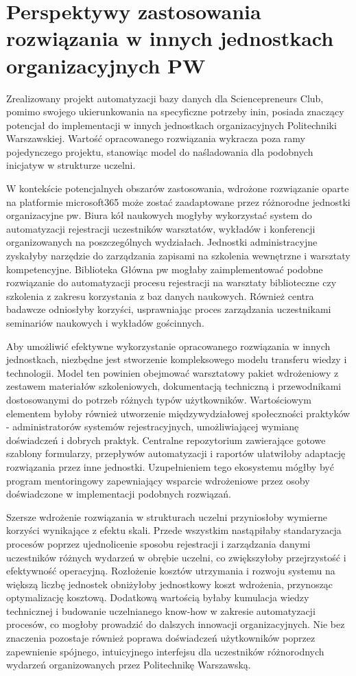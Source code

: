 \section{Perspektywy zastosowania rozwiązania w innych jednostkach organizacyjnych PW}

Zrealizowany projekt automatyzacji bazy danych dla Sciencepreneurs Club, pomimo swojego ukierunkowania na specyficzne potrzeby \gls{inin}, posiada znaczący potencjał do implementacji w innych jednostkach organizacyjnych Politechniki Warszawskiej. Wartość opracowanego rozwiązania wykracza poza ramy pojedynczego projektu, stanowiąc model do naśladowania dla podobnych inicjatyw w strukturze uczelni.

W kontekście potencjalnych obszarów zastosowania, wdrożone rozwiązanie oparte na platformie \gls{microsoft365} może zostać zaadaptowane przez różnorodne jednostki organizacyjne \gls{pw}. Biura kół naukowych mogłyby wykorzystać system do automatyzacji rejestracji uczestników warsztatów, wykładów i konferencji organizowanych na poszczególnych wydziałach. Jednostki administracyjne zyskałyby narzędzie do zarządzania zapisami na szkolenia wewnętrzne i warsztaty kompetencyjne. Biblioteka Główna \gls{pw} mogłaby zaimplementować podobne rozwiązanie do automatyzacji procesu rejestracji na warsztaty biblioteczne czy szkolenia z zakresu korzystania z baz danych naukowych. Również centra badawcze odniosłyby korzyści, usprawniając proces zarządzania uczestnikami seminariów naukowych i wykładów gościnnych.

Aby umożliwić efektywne wykorzystanie opracowanego rozwiązania w innych jednostkach, niezbędne jest stworzenie kompleksowego modelu transferu wiedzy i technologii. Model ten powinien obejmować warsztatowy pakiet wdrożeniowy z zestawem materiałów szkoleniowych, dokumentacją techniczną i przewodnikami dostosowanymi do potrzeb różnych typów użytkowników. Wartościowym elementem byłoby również utworzenie międzywydziałowej społeczności praktyków - administratorów systemów rejestracyjnych, umożliwiającej wymianę doświadczeń i dobrych praktyk. Centralne repozytorium zawierające gotowe szablony formularzy, przepływów automatyzacji i raportów ułatwiłoby adaptację rozwiązania przez inne jednostki. Uzupełnieniem tego ekosystemu mógłby być program mentoringowy zapewniający wsparcie wdrożeniowe przez osoby doświadczone w implementacji podobnych rozwiązań.

Szersze wdrożenie rozwiązania w strukturach uczelni przyniosłoby wymierne korzyści wynikające z efektu skali. Przede wszystkim nastąpiłaby standaryzacja procesów poprzez ujednolicenie sposobu rejestracji i zarządzania danymi uczestników różnych wydarzeń w obrębie uczelni, co zwiększyłoby przejrzystość i efektywność operacyjną. Rozłożenie kosztów utrzymania i rozwoju systemu na większą liczbę jednostek obniżyłoby jednostkowy koszt wdrożenia, przynosząc optymalizację kosztową. Dodatkową wartością byłaby kumulacja wiedzy technicznej i budowanie uczelnianego know-how w zakresie automatyzacji procesów, co mogłoby prowadzić do dalszych innowacji organizacyjnych. Nie bez znaczenia pozostaje również poprawa doświadczeń użytkowników poprzez zapewnienie spójnego, intuicyjnego interfejsu dla uczestników różnorodnych wydarzeń organizowanych przez Politechnikę Warszawską.

